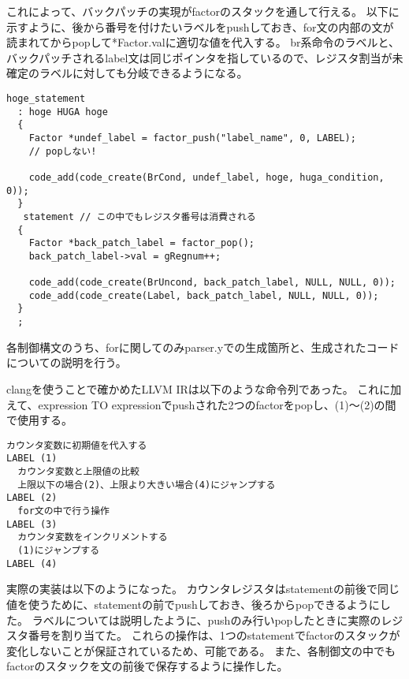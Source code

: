 これによって、バックパッチの実現がfactorのスタックを通して行える。
以下に示すように、後から番号を付けたいラベルをpushしておき、for文の内部の文が読まれてからpopして*Factor.valに適切な値を代入する。
br系命令のラベルと、バックパッチされるlabel文は同じポインタを指しているので、レジスタ割当が未確定のラベルに対しても分岐できるようになる。

\begin{lstlisting}[caption={バックパッチの方法},label={バックパッチの方法}]
hoge_statement
  : hoge HUGA hoge
  {
    Factor *undef_label = factor_push("label_name", 0, LABEL);
    // popしない!

    code_add(code_create(BrCond, undef_label, hoge, huga_condition, 0));
  }
   statement // この中でもレジスタ番号は消費される
  {
    Factor *back_patch_label = factor_pop();
    back_patch_label->val = gRegnum++;

    code_add(code_create(BrUncond, back_patch_label, NULL, NULL, 0));
    code_add(code_create(Label, back_patch_label, NULL, NULL, 0));
  }
  ;
\end{lstlisting}

各制御構文のうち、forに関してのみparser.yでの生成箇所と、生成されたコードについての説明を行う。

clangを使うことで確かめたLLVM IRは以下のような命令列であった。
これに加えて、expression TO expressionでpushされた2つのfactorをpopし、(1)～(2)の間で使用する。

\begin{lstlisting}[caption={for文のLLVM IR},label={for文のLLVM IR}]
  カウンタ変数に初期値を代入する
LABEL (1)
  カウンタ変数と上限値の比較
  上限以下の場合(2)、上限より大きい場合(4)にジャンプする
LABEL (2)
  for文の中で行う操作
LABEL (3)
  カウンタ変数をインクリメントする
  (1)にジャンプする
LABEL (4)
\end{lstlisting}

実際の実装は以下のようになった。
カウンタレジスタはstatementの前後で同じ値を使うために、statementの前でpushしておき、後ろからpopできるようにした。
ラベルについては説明したように、pushのみ行いpopしたときに実際のレジスタ番号を割り当てた。
これらの操作は、1つのstatementでfactorのスタックが変化しないことが保証されているため、可能である。
また、各制御文の中でもfactorのスタックを文の前後で保存するように操作した。

